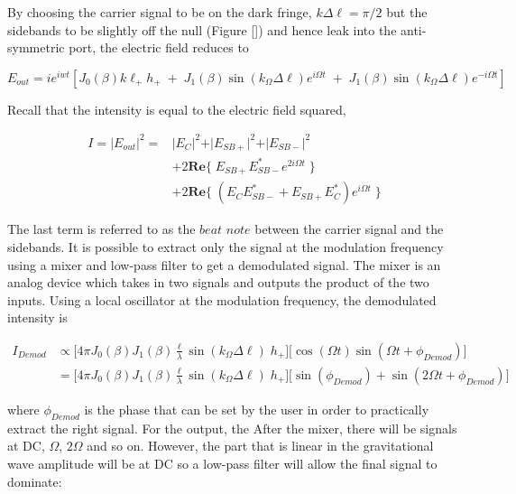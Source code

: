 		By choosing the carrier signal to be on the dark fringe, $k \Delta \ell = \pi/2$ but the sidebands to be slightly off the null (Figure []) and hence leak into the anti-symmetric port, the electric field reduces to
		
		\begin{equation}
		E_{out} = i e^{iwt} [ J_0(\beta) 	k \ell_{+}  h_{+}  \; + \; J_1(\beta) \sin(k_{\Omega} \Delta \ell) e^{i\Omega t} \; + \; J_1(\beta) \sin( k_{\Omega} \Delta \ell) e^{-i\Omega t} ]
		\end{equation}
		
		Recall that the intensity is equal to the electric field squared,
		
		\begin{equation}
		\begin{aligned}
			I	= \vert E_{out} \vert^2  =	&\vert E_{C}\vert^2 + \vert E_{SB+}\vert^2 + \vert E_{SB-}\vert^2 \\
										  	& + 2 \mathbf{Re} \{ \; E_{SB+} E^*_{SB-} e^{2i\Omega t} \; \}\\
										  	& + 2 \mathbf{Re} \{ \; (E_{C} E^*_{SB-} +  E_{SB+} E^*_{C} ) e^{i\Omega t} \; \}
		\end{aligned}
		\end{equation}
		
		The last term is referred to as the $beat$ $note$ between the carrier signal and the sidebands.  It is possible to extract only the signal at the modulation frequency using a mixer and low-pass filter to get a demodulated signal.  The mixer is an analog device which takes in two signals and outputs the product of the two inputs. Using a local oscillator at the modulation frequency, the demodulated intensity is 
		
		\begin{equation}
		\begin{aligned}
		I_{Demod} 	&\propto \big[ 4 \pi  J_0(\beta) J_1(\beta) \frac{\ell}{\lambda}  \sin(k_{\Omega} \Delta \ell)  \; h_{+}\big] \big[ \cos(\Omega t)  \sin(\Omega t + \phi_{Demod}) \big] \\
					&= \big[ 4 \pi  J_0(\beta) J_1(\beta) \frac{\ell}{\lambda}  \sin(k_{\Omega} \Delta \ell)  \; h_{+}\big] \big[ \sin(\phi_{Demod}) + \sin(2\Omega t + \phi_{Demod}) \big]
		\end{aligned}
		\end{equation}
		
		where $\phi_{Demod}$ is the phase that can be set by the user in order to practically extract the right signal. For the output, the   After the mixer, there will be signals at DC, $\Omega$, $2\Omega$ and so on. However, the part that is linear in the gravitational wave amplitude will be at DC so a low-pass filter will allow the final signal to dominate:
		
